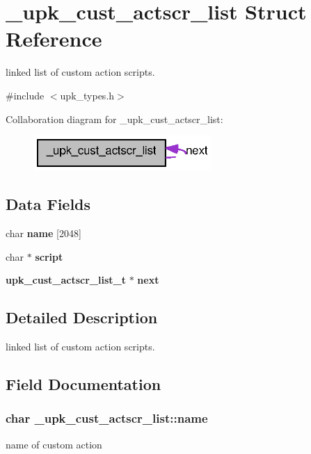 \section{\_\-upk\_\-cust\_\-actscr\_\-list Struct Reference}
\label{struct__upk__cust__actscr__list}


linked list of custom action scripts.  




{\ttfamily \#include $<$upk\_\-types.h$>$}



Collaboration diagram for \_\-upk\_\-cust\_\-actscr\_\-list:\nopagebreak
\begin{figure}[H]
\begin{center}
\leavevmode
\includegraphics[width=191pt]{struct__upk__cust__actscr__list__coll__graph}
\end{center}
\end{figure}
\subsection*{Data Fields}
\begin{DoxyCompactItemize}
\item 
char {\bf name} [2048]
\item 
char $\ast$ {\bf script}
\item 
{\bf upk\_\-cust\_\-actscr\_\-list\_\-t} $\ast$ {\bf next}
\end{DoxyCompactItemize}


\subsection{Detailed Description}
linked list of custom action scripts. 

\subsection{Field Documentation}
\subsubsection[{name}]{\setlength{\rightskip}{0pt plus 5cm}char {\bf \_\-upk\_\-cust\_\-actscr\_\-list::name}}\label{struct__upk__cust__actscr__list_a6ea44eb98fd8ba848c52f7b86b837737}
name of custom action 

